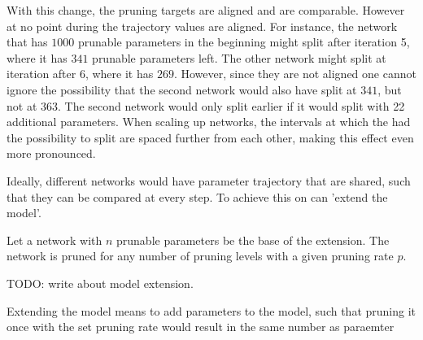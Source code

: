 With this change, the pruning targets are aligned and are comparable.
However at no point during the trajectory values are aligned.
For instance, the network that has $1000$ prunable parameters in the beginning might split after iteration 5, where it has $341$ prunable parameters left. 
The other network might split at iteration after 6, where it has $269$.
However, since they are not aligned one cannot ignore the possibility that the second network would also have split at $341$, but not at $363$. 
The second network would only split earlier if it would split with 22 additional parameters.
When scaling up networks, the intervals at which the had the possibility to split are spaced further from each other, making this effect even more pronounced.

Ideally, different networks would have parameter trajectory that are shared, such that they can be compared at every step.
To achieve this on can 'extend the model'.

Let a network with $n$ prunable parameters be the base of the extension.
The network is pruned for any number of pruning levels with a given pruning rate $p$.

TODO: write about model extension.

Extending the model means to add parameters to the model, such that pruning it once with the set pruning rate would result in the same number as paraemter